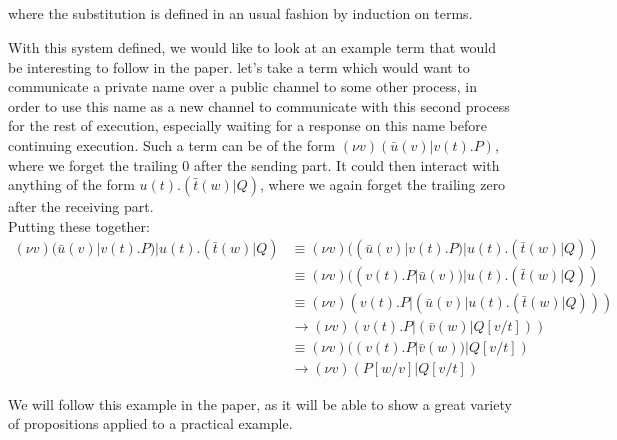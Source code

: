 \begin{definition}
\indent\hfill\begin{prooftree}\end{prooftree}\hfill
\begin{prooftree}\end{prooftree}\hfill~\\~\\
\begin{prooftree}\end{prooftree}\hfill
\begin{prooftree}\end{prooftree}\hfill
\begin{prooftree}\end{prooftree}\\~\\
where the substitution is defined in an usual fashion by induction on terms.
\end{definition}

With this system defined, we would like to look at an example term that would be interesting to follow in the paper.
\example let's take a term which would want to communicate a private name over a public channel to some other process, in order to use this name as a new channel to communicate with this second process for the rest of execution, especially waiting for a response on this name before continuing execution. Such a term can be of the form $(\nu v)(\bar{u}(v)|v(t).P)$, where we forget the trailing 0 after the sending part. It could then interact with anything of the form $u(t).(\bar{t}(w)|Q)$, where we again forget the trailing zero after the receiving part.\\
Putting these together:
\begin{align*}
(\nu v)(\bar{u}(v)|v(t).P)|u(t).(\bar{t}(w)|Q) &\equiv (\nu v)((\bar{u}(v)|v(t).P)|u(t).(\bar{t}(w)|Q))\\
&\equiv (\nu v)((v(t).P|\bar{u}(v))|u(t).(\bar{t}(w)|Q))\\
&\equiv (\nu v)(v(t).P|(\bar{u}(v)|u(t).(\bar{t}(w)|Q)))\\
&\to (\nu v)(v(t).P|(\bar{v}(w)|Q[v/t]))\\
&\equiv (\nu v)((v(t).P|\bar{v}(w))|Q[v/t])\\
&\to (\nu v)(P[w/v]|Q[v/t])
\end{align*}

We will follow this example in the paper, as it will be able to show a great variety of propositions applied to a practical example.

